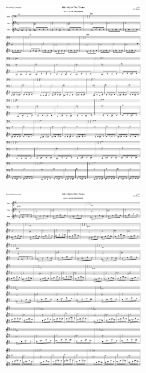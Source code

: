 \begin{figure}[H]                                             
{                                                             
  \setlength{\tabcolsep}{3.0pt}                               
  \setlength\cmidrulewidth{\heavyrulewidth} %
    \begin{subfigure}{0.5\textwidth}                            
  \includegraphics[width=6cm]{music/title_no_39_page_1001.png}%
    \end{subfigure}                                             
  \begin{subfigure}{0.5\textwidth}                            
  \includegraphics[width=6cm]{music/title_no_40_page_1001.png}%
    \end{subfigure}                                             
}                                                             
\end{figure}                                                  


